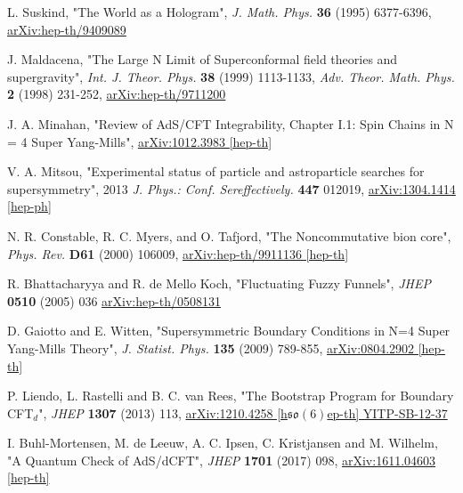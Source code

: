 \documentclass[a4paper,12pt]{article}
\theoremstyle{definition}
\theoremstyle{theorem}
\numberwithin{equation}{subsection}
\begin{document}
\begin{thebibliography}{9}

L. Suskind, 
"The World as a Hologram", 
\textit{J. Math. Phys.} \textbf{36} (1995) 6377-6396, 
\href{https://arxiv.org/abs/hep-th/9409089}{arXiv:hep-th/9409089}

J. Maldacena, 
"The Large N Limit of Superconformal field theories and supergravity", 
\textit{Int. J. Theor. Phys.} \textbf{38} (1999) 1113-1133, \textit{Adv. Theor. Math. Phys.} \textbf{2} (1998) 231-252, 
\href{https://arxiv.org/abs/hep-th/9711200}{arXiv:hep-th/9711200}

J. A. Minahan, 
"Review of AdS/CFT Integrability, Chapter I.1: Spin Chains in N = 4 Super Yang-Mills", 
\href{https://arxiv.org/abs/1012.3983}{arXiv:1012.3983 [hep-th]}

V. A. Mitsou, 
"Experimental status of particle and astroparticle
searches for supersymmetry", 
2013 \textit{J. Phys.: Conf. Sereffectively.} \textbf{447} 012019, 
\href{https://arxiv.org/abs/1304.1414}{	arXiv:1304.1414 [hep-ph]}

N. R. Constable, R. C. Myers, and O. Tafjord, 
"The Noncommutative bion core", 
\textit{Phys. Rev.} \textbf{D61} (2000) 106009, 
\href{https://arxiv.org/abs/hep-th/9911136}{arXiv:hep-th/9911136 [hep-th]}

R. Bhattacharyya and R. de Mello Koch, 
"Fluctuating Fuzzy Funnels", 
\textit{JHEP} \textbf{0510} (2005) 036
\href{https://arxiv.org/abs/hep-th/0508131}{arXiv:hep-th/0508131}

D. Gaiotto and E. Witten, 
"Supersymmetric Boundary Conditions in N=4 Super Yang-Mills Theory", 
\textit{J. Statist. Phys.} \textbf{135} (2009) 789-855, 
\href{https://arxiv.org/abs/0804.2902}{arXiv:0804.2902 [hep-th]}

P. Liendo, L. Rastelli and B. C. van Rees, 
"The Bootstrap Program for Boundary CFT${}_d$", 
\textit{JHEP} \textbf{1307} (2013) 113, 
\href{https://arxiv.org/abs/1210.4258}{arXiv:1210.4258 [h$\mathfrak{so}(6)$ep-th] YITP-SB-12-37}

I. Buhl-Mortensen, M. de Leeuw, A. C. Ipsen, C. Kristjansen and M. Wilhelm, 
"A Quantum Check of AdS/dCFT", 
\textit{JHEP} \textbf{1701} (2017) 098, 
\href{https://arxiv.org/abs/1611.04603}{arXiv:1611.04603 [hep-th]}


\end{thebibliography}
\end{document}
